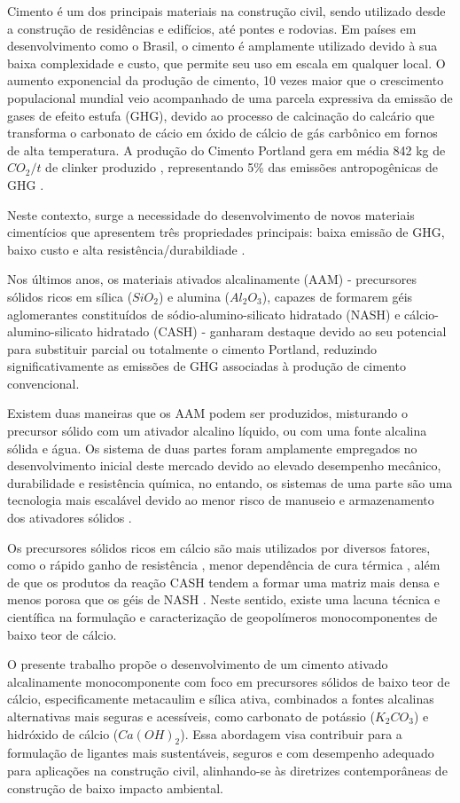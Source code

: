 Cimento é um dos principais materiais na construção civil, sendo utilizado desde a construção de residências e edifícios, até pontes e rodovias.
Em países em desenvolvimento como o Brasil, o cimento é amplamente utilizado devido à sua baixa complexidade e custo, que permite seu uso em escala em qualquer local.
O aumento exponencial da produção de cimento, 10 vezes maior que o crescimento populacional mundial \cite{united1995world} veio acompanhado de uma parcela expressiva da emissão de gases de efeito estufa (GHG), devido ao processo de calcinação do calcário que transforma o carbonato de cácio em óxido de cálcio de gás carbônico em fornos de alta temperatura.
A produção do Cimento Portland gera em média 842 kg de $CO_2/t$ de clinker produzido \cite{andrew2018global}, representando 5\% das emissões antropogênicas de GHG \cite{IEA_WBCSD_2009}.

Neste contexto, surge a necessidade do desenvolvimento de novos materiais cimentícios que apresentem três propriedades principais: baixa emissão de GHG, baixo custo e alta resistência/durabildiade \cite{scrivener2018eco}.

Nos últimos anos, os materiais ativados alcalinamente (AAM) - precursores sólidos ricos em sílica ($SiO_2$) e alumina ($Al_2O_3$), capazes de formarem géis aglomerantes constituídos de sódio-alumino-silicato hidratado (NASH) e cálcio-alumino-silicato hidratado (CASH) - ganharam destaque devido ao seu potencial para substituir parcial ou totalmente o cimento Portland, reduzindo significativamente as emissões de GHG associadas à produção de cimento convencional.

Existem duas maneiras que os AAM podem ser produzidos, misturando o precursor sólido com um ativador alcalino líquido, ou com uma fonte alcalina sólida e água.
Os sistema de duas partes foram amplamente empregados no desenvolvimento inicial deste mercado devido ao elevado desempenho mecânico, durabilidade e resistência química, no entando, os sistemas de uma parte são uma tecnologia mais escalável devido ao menor risco de manuseio e armazenamento dos ativadores sólidos \cite{provis2018alkali}.

Os precursores sólidos ricos em cálcio são mais utilizados por diversos fatores, como o rápido ganho de resistência \cite{provis2014geopolymers}, menor dependência de cura térmica \cite{ke2021one}, além de que os produtos da reação CASH tendem a formar uma matriz mais densa e menos porosa que os géis de NASH \cite{bernal2014engineering}.
Neste sentido, existe uma lacuna técnica e científica na formulação e caracterização de geopolímeros monocomponentes de baixo teor de cálcio.


O presente trabalho propõe o desenvolvimento de um cimento ativado alcalinamente monocomponente com foco em precursores sólidos de baixo teor de cálcio, especificamente metacaulim e sílica ativa, combinados a fontes alcalinas alternativas mais seguras e acessíveis, como carbonato de potássio ($K_2CO_3$) e hidróxido de cálcio ($Ca(OH)_2$).
Essa abordagem visa contribuir para a formulação de ligantes mais sustentáveis, seguros e com desempenho adequado para aplicações na construção civil, alinhando-se às diretrizes contemporâneas de construção de baixo impacto ambiental.